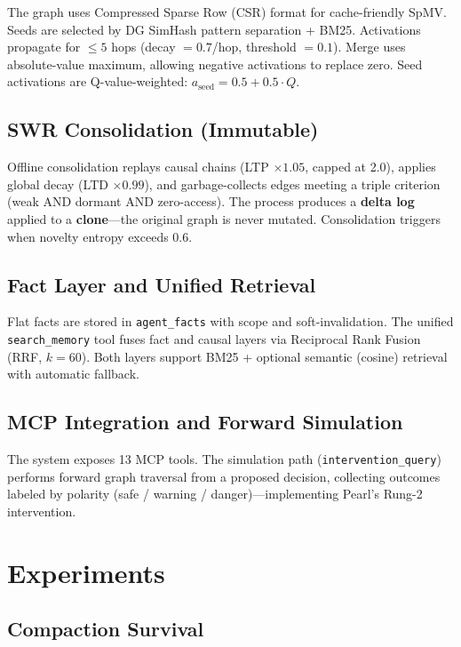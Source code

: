 \documentclass[letterpaper,twocolumn,10pt]{article}
\begin{document}
The graph uses Compressed Sparse Row (CSR) format for cache-friendly SpMV. Seeds are selected by DG SimHash pattern separation + BM25. Activations propagate for $\leq 5$ hops (decay $= 0.7$/hop, threshold $= 0.1$). Merge uses absolute-value maximum, allowing negative activations to replace zero. Seed activations are Q-value-weighted: $a_{\text{seed}} = 0.5 + 0.5 \cdot Q$.

\subsection{SWR Consolidation (Immutable)}

Offline consolidation replays causal chains (LTP $\times 1.05$, capped at 2.0), applies global decay (LTD $\times 0.99$), and garbage-collects edges meeting a triple criterion (weak AND dormant AND zero-access). The process produces a \textbf{delta log} applied to a \textbf{clone}---the original graph is never mutated. Consolidation triggers when novelty entropy exceeds 0.6.

\subsection{Fact Layer and Unified Retrieval}

Flat facts are stored in \texttt{agent\_facts} with scope and soft-invalidation. The unified \texttt{search\_memory} tool fuses fact and causal layers via Reciprocal Rank Fusion (RRF, $k\!=\!60$). Both layers support BM25 + optional semantic (cosine) retrieval with automatic fallback.

\subsection{MCP Integration and Forward Simulation}

The system exposes 13 MCP tools. The simulation path (\texttt{intervention\_query}) performs forward graph traversal from a proposed decision, collecting outcomes labeled by polarity (safe / warning / danger)---implementing Pearl's Rung-2 intervention.

\section{Experiments}
\label{sec:experiments}

\subsection{Compaction Survival}
\end{document}
